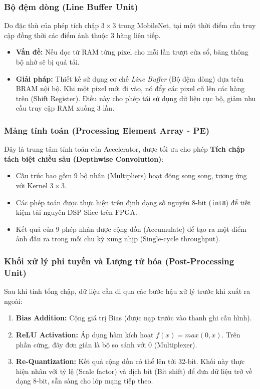 \subsubsection{Bộ đệm dòng (Line Buffer Unit)}
Do đặc thù của phép tích chập $3 \times 3$ trong MobileNet, tại một thời điểm cần truy cập đồng thời các điểm ảnh thuộc 3 hàng liên tiếp. 
\begin{itemize}
    \item \textbf{Vấn đề:} Nếu đọc từ RAM từng pixel cho mỗi lần trượt cửa sổ, băng thông bộ nhớ sẽ bị quá tải.
    \item \textbf{Giải pháp:} Thiết kế sử dụng cơ chế \textit{Line Buffer} (Bộ đệm dòng) dựa trên BRAM nội bộ. Khi một pixel mới đi vào, nó đẩy các pixel cũ lên các hàng trên (Shift Register). Điều này cho phép tái sử dụng dữ liệu cục bộ, giảm nhu cầu truy cập RAM xuống 3 lần.
\end{itemize}

\subsubsection{Mảng tính toán (Processing Element Array - PE)}
Đây là trung tâm tính toán của Accelerator, được tối ưu cho phép \textbf{Tích chập tách biệt chiều sâu (Depthwise Convolution)}:
\begin{itemize}
    \item Cấu trúc bao gồm 9 bộ nhân (Multipliers) hoạt động song song, tương ứng với Kernel $3 \times 3$.
    \item Các phép toán được thực hiện trên định dạng số nguyên 8-bit (\texttt{int8}) để tiết kiệm tài nguyên DSP Slice trên FPGA.
    \item Kết quả của 9 phép nhân được cộng dồn (Accumulate) để tạo ra một điểm ảnh đầu ra trong mỗi chu kỳ xung nhịp (Single-cycle throughput).
\end{itemize}

\subsubsection{Khối xử lý phi tuyến và Lượng tử hóa (Post-Processing Unit)}
Sau khi tính tổng chập, dữ liệu cần đi qua các bước hậu xử lý trước khi xuất ra ngoài:
\begin{enumerate}
    \item \textbf{Bias Addition:} Cộng giá trị Bias (được nạp trước vào thanh ghi cấu hình).
    \item \textbf{ReLU Activation:} Áp dụng hàm kích hoạt $f(x) = max(0, x)$. Trên phần cứng, đây đơn giản là bộ so sánh với 0 (Multiplexer).
    \item \textbf{Re-Quantization:} Kết quả cộng dồn có thể lên tới 32-bit. Khối này thực hiện nhân với tỷ lệ (Scale factor) và dịch bit (Bit shift) để đưa dữ liệu trở về dạng 8-bit, sẵn sàng cho lớp mạng tiếp theo.
\end{enumerate}

